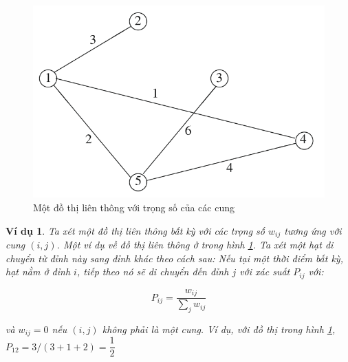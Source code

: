 \documentclass[14pt, a4paper]{article}
\numberwithin{equation}{section}
\numberwithin{figure}{section}
\theoremstyle{sltheorem}
\newtheorem{vd}{Ví dụ}
\theoremstyle{soltheorem}
\numberwithin{dl}{section}
\numberwithin{md}{section}
\numberwithin{vd}{section}
\begin{document}
    \begin{figure}[h!]
        \centering
        \includegraphics[scale=0.5]{1.png}
        \caption{Một đồ thị liên thông với trọng số của các cung}
        \label{fig:4.1}
    \end{figure}

    \begin{vd}
        Ta xét một đồ thị liên thông bất kỳ với các trọng số $w_{ij}$ tương ứng với cung $(i, j)$.
        Một ví dụ về đồ thị liên thông ở trong hình \ref{fig:4.1}.
        Ta xét một hạt di chuyển từ đỉnh này sang đỉnh khác theo cách sau: Nếu tại một thời điểm bất kỳ, hạt nằm ở đỉnh $i$, tiếp theo nó sẽ di chuyển đến đỉnh $j$ với xác suất $P_{ij}$ với:

        \begin{equation*}
            P_{ij} = \dfrac{w_{ij}}{\sum_j w_{ij}}
        \end{equation*}

        và $w_{ij} = 0$ nếu $(i, j)$ không phải là một cung.
        Ví dụ, với đồ thị trong hình \ref{fig:4.1}, $P_{12}=3/(3+1+2)=\dfrac{1}{2}$
    \end{vd}
\end{document}
